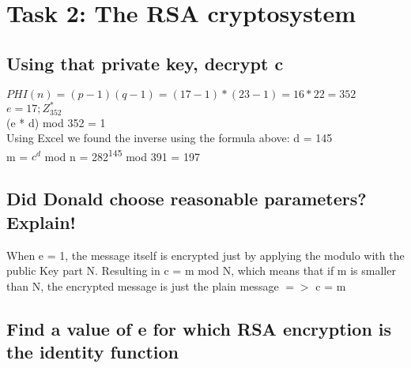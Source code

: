\section{Task 2: The RSA cryptosystem}


\subsection{Using that private key, decrypt c}

$PHI(n) = (p-1)(q-1) = (17 - 1) * (23 - 1) = 16 * 22 = 352$\\

$e = 17; Z^*_{352}$\\
(e * d) mod 352 = 1\\

Using Excel we found the inverse using the formula above: d = 145\\

m = $c^d$ mod n = 282\textsuperscript{145} mod 391 = 197

\subsection{Did Donald choose reasonable parameters? Explain!}

When e = 1, the message itself is encrypted just by applying the modulo with the public Key part N. Resulting in c = m mod N, which means that if m is smaller than N, the encrypted message is just the plain message $=>$ c = m
 
\subsection{Find a value of e for which RSA encryption is the identity function}

